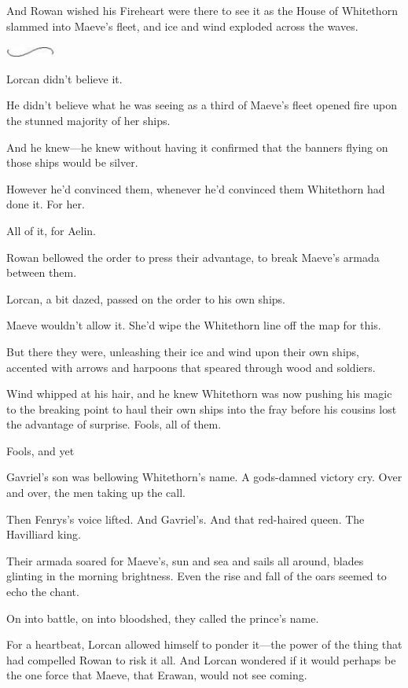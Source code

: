 And Rowan wished his Fireheart were there to see it as the House of Whitethorn slammed into Maeve's fleet, and ice and wind exploded across the waves.

\includegraphics[width=0.65in,height=0.13in]{images/seperator}

Lorcan didn't believe it.

He didn't believe what he was seeing as a third of Maeve's fleet opened fire upon the stunned majority of her ships.

And he knew---he knew without having it confirmed that the banners flying on those ships would be silver.

However he'd convinced them, whenever he'd convinced them 
Whitethorn had done it. For her.

All of it, for Aelin.

Rowan bellowed the order to press their advantage, to break Maeve's armada between them.

Lorcan, a bit dazed, passed on the order to his own ships.

Maeve wouldn't allow it. She'd wipe the Whitethorn line off the map for this.

But there they were, unleashing their ice and wind upon their own ships, accented with arrows and harpoons that speared through wood and soldiers.

Wind whipped at his hair, and he knew Whitethorn was now pushing his magic to the breaking point to haul their own ships into the fray before his cousins lost the advantage of surprise. Fools, all of them.

Fools, and yet 

Gavriel's son was bellowing Whitethorn's name. A gods-damned victory cry. Over and over, the men taking up the call.

Then Fenrys's voice lifted. And Gavriel's. And that red-haired queen. The Havilliard king.

Their armada soared for Maeve's, sun and sea and sails all around, blades glinting in the morning brightness. Even the rise and fall of the oars seemed to echo the chant.

On into battle, on into bloodshed, they called the prince's name.

For a heartbeat, Lorcan allowed himself to ponder it---the power of the thing that had compelled Rowan to risk it all. And Lorcan wondered if it would perhaps be the one force that Maeve, that Erawan, would not see coming.

